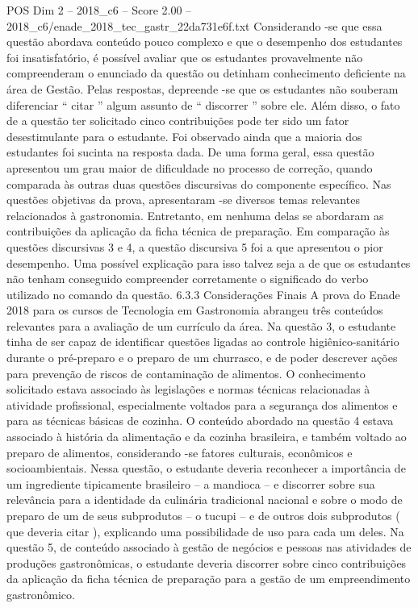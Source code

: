 \begin{textsample}{POS Dim 2 – 2018\_c6 – Score 2.00 – 2018\_c6/enade\_2018\_tec\_gastr\_22da731e6f.txt}
Considerando -se que essa questão abordava conteúdo pouco complexo e que o desempenho dos estudantes foi insatisfatório, é possível avaliar que os estudantes provavelmente não compreenderam o enunciado da questão ou detinham conhecimento deficiente na área de Gestão.
Pelas respostas, depreende -se que os estudantes não souberam diferenciar “ citar ” algum assunto de “ discorrer ” sobre ele.
Além disso, o fato de a questão ter solicitado cinco contribuições pode ter sido um fator desestimulante para o estudante.
Foi observado ainda que a maioria dos estudantes foi sucinta na resposta dada.
De uma forma geral, essa questão apresentou um grau maior de dificuldade no processo de correção, quando comparada às outras duas questões discursivas do componente específico.
Nas questões objetivas da prova, apresentaram -se diversos temas relevantes relacionados à gastronomia.
Entretanto, em nenhuma delas se abordaram as contribuições da aplicação da ficha técnica de preparação.
Em comparação às questões discursivas 3 e 4, a questão discursiva 5 foi a que apresentou o pior desempenho.
Uma possível explicação para isso talvez seja a de que os estudantes não tenham conseguido compreender corretamente o significado do verbo utilizado no comando da questão. 6.3.3 Considerações Finais A prova do Enade 2018 para os cursos de Tecnologia em Gastronomia abrangeu três conteúdos relevantes para a avaliação de um currículo da área.
Na questão 3, o estudante tinha de ser capaz de identificar questões ligadas ao controle higiênico-sanitário durante o pré-preparo e o preparo de um churrasco, e de poder descrever ações para prevenção de riscos de contaminação de alimentos.
O conhecimento solicitado estava associado às legislações e normas técnicas relacionadas à atividade profissional, especialmente voltados para a segurança dos alimentos e para as técnicas básicas de cozinha.
O conteúdo abordado na questão 4 estava associado à história da alimentação e da cozinha brasileira, e também voltado ao preparo de alimentos, considerando -se fatores culturais, econômicos e socioambientais.
Nessa questão, o estudante deveria reconhecer a importância de um ingrediente tipicamente brasileiro – a mandioca – e discorrer sobre sua relevância para a identidade da culinária tradicional nacional e sobre o modo de preparo de um de seus subprodutos – o tucupi – e de outros dois subprodutos ( que deveria citar ), explicando uma possibilidade de uso para cada um deles.
Na questão 5, de conteúdo associado à gestão de negócios e pessoas nas atividades de produções gastronômicas, o estudante deveria discorrer sobre cinco contribuições da aplicação da ficha técnica de preparação para a gestão de um empreendimento gastronômico.

\end{textsample}
